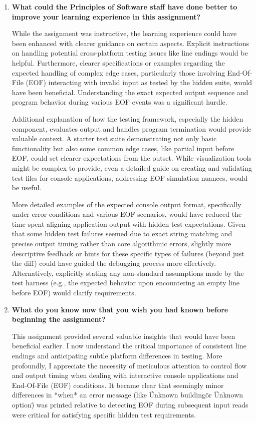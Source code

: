 \documentclass[11pt]{article}
\begin{document}
\begin{enumerate}
    \item \textbf{What could the Principles of Software staff have done better to improve your learning experience in this assignment?}

    While the assignment was instructive, the learning experience could have been enhanced with clearer guidance on certain aspects. Explicit instructions on handling potential cross-platform testing issues like line endings would be helpful. Furthermore, clearer specifications or examples regarding the expected handling of complex edge cases, particularly those involving End-Of-File (EOF) interacting with invalid input as tested by the hidden suite, would have been beneficial. Understanding the exact expected output sequence and program behavior during various EOF events was a significant hurdle.

    Additional explanation of how the testing framework, especially the hidden component, evaluates output and handles program termination would provide valuable context. A starter test suite demonstrating not only basic functionality but also some common edge cases, like partial input before EOF, could set clearer expectations from the outset. While visualization tools might be complex to provide, even a detailed guide on creating and validating test files for console applications, addressing EOF simulation nuances, would be useful.

    More detailed examples of the expected console output format, specifically under error conditions and various EOF scenarios, would have reduced the time spent aligning application output with hidden test expectations. Given that some hidden test failures seemed due to exact string matching and precise output timing rather than core algorithmic errors, slightly more descriptive feedback or hints for these specific types of failures (beyond just the diff) could have guided the debugging process more effectively. Alternatively, explicitly stating any non-standard assumptions made by the test harness (e.g., the expected behavior upon encountering an empty line before EOF) would clarify requirements.

    \item \textbf{What do you know now that you wish you had known before beginning the assignment?}

    This assignment provided several valuable insights that would have been beneficial earlier. I now understand the critical importance of consistent line endings and anticipating subtle platform differences in testing. More profoundly, I appreciate the necessity of meticulous attention to control flow and output timing when dealing with interactive console applications and End-Of-File (EOF) conditions. It became clear that seemingly minor differences in *when* an error message (like \"Unknown building\" or \"Unknown option\") was printed relative to detecting EOF during subsequent input reads were critical for satisfying specific hidden test requirements.


\end{enumerate}
\end{document}
